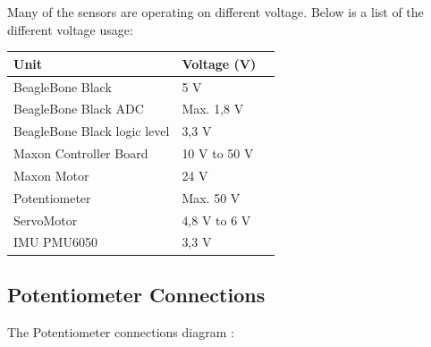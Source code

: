 Many of the sensors are operating on different voltage. Below is a list of the different voltage usage:
\begin{table}[H]
	\begin{tabular}{|l|l|p{4.3cm}|}
		\hline%
		\textbf{Unit}       &  \textbf{Voltage (V)}         \\
		\hline%
		BeagleBone Black                               & 5 V           \\
		\hline%
		BeagleBone Black ADC							  & Max. 1,8 V              \\
		\hline%
		BeagleBone Black logic level							  & 3,3 V              \\
		\hline%
		Maxon Controller Board 							  & 10 V to 50 V              \\
		\hline%
		Maxon Motor							  & 24 V             \\
		\hline%
		Potentiometer							  & Max. 50 V              \\
		\hline%
		ServoMotor							  & 4,8 V to 6 V              \\
		\hline%
		IMU PMU6050							  & 3,3 V              \\
		\hline%
	\end{tabular}
\end{table}

\subsection{Potentiometer Connections}
The Potentiometer connections diagram :\\

